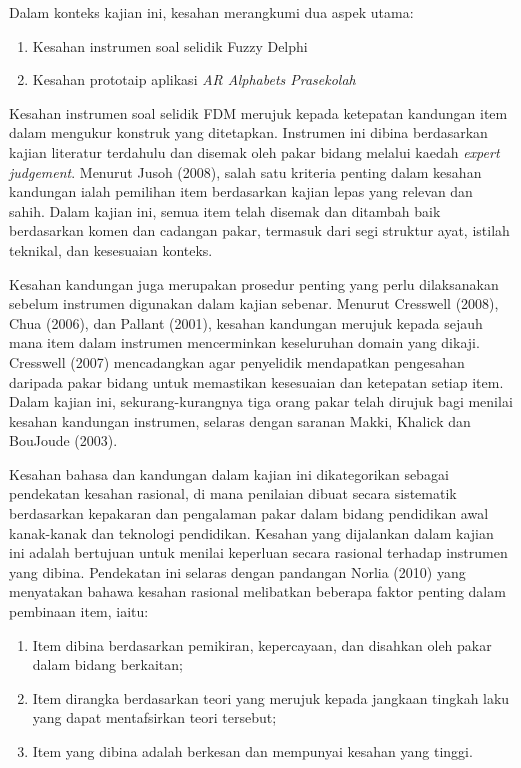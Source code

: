 \begin{itemize}
Dalam konteks kajian ini, kesahan merangkumi dua aspek utama:
\begin{enumerate}
  \item Kesahan instrumen soal selidik Fuzzy Delphi
  \item Kesahan prototaip aplikasi \textit{AR Alphabets Prasekolah}
\end{enumerate}

Kesahan instrumen soal selidik FDM merujuk kepada ketepatan kandungan item dalam mengukur konstruk yang ditetapkan. Instrumen ini dibina berdasarkan kajian literatur terdahulu dan disemak oleh pakar bidang melalui kaedah \textit{expert judgement}. Menurut Jusoh (2008), salah satu kriteria penting dalam kesahan kandungan ialah pemilihan item berdasarkan kajian lepas yang relevan dan sahih. Dalam kajian ini, semua item telah disemak dan ditambah baik berdasarkan komen dan cadangan pakar, termasuk dari segi struktur ayat, istilah teknikal, dan kesesuaian konteks.

Kesahan kandungan juga merupakan prosedur penting yang perlu dilaksanakan sebelum instrumen digunakan dalam kajian sebenar. Menurut Cresswell (2008), Chua (2006), dan Pallant (2001), kesahan kandungan merujuk kepada sejauh mana item dalam instrumen mencerminkan keseluruhan domain yang dikaji. Cresswell (2007) mencadangkan agar penyelidik mendapatkan pengesahan daripada pakar bidang untuk memastikan kesesuaian dan ketepatan setiap item. Dalam kajian ini, sekurang-kurangnya tiga orang pakar telah dirujuk bagi menilai kesahan kandungan instrumen, selaras dengan saranan Makki, Khalick dan BouJoude (2003).

Kesahan bahasa dan kandungan dalam kajian ini dikategorikan sebagai pendekatan kesahan rasional, di mana penilaian dibuat secara sistematik berdasarkan kepakaran dan pengalaman pakar dalam bidang pendidikan awal kanak-kanak dan teknologi pendidikan.
Kesahan yang dijalankan dalam kajian ini adalah bertujuan untuk menilai keperluan secara rasional terhadap instrumen yang dibina. Pendekatan ini selaras dengan pandangan Norlia (2010) yang menyatakan bahawa kesahan rasional melibatkan beberapa faktor penting dalam pembinaan item, iaitu:

\begin{enumerate}
  \item Item dibina berdasarkan pemikiran, kepercayaan, dan disahkan oleh pakar dalam bidang berkaitan;
  \item Item dirangka berdasarkan teori yang merujuk kepada jangkaan tingkah laku yang dapat mentafsirkan teori tersebut;
  \item Item yang dibina adalah berkesan dan mempunyai kesahan yang tinggi.
\end{enumerate}


\end{itemize}

